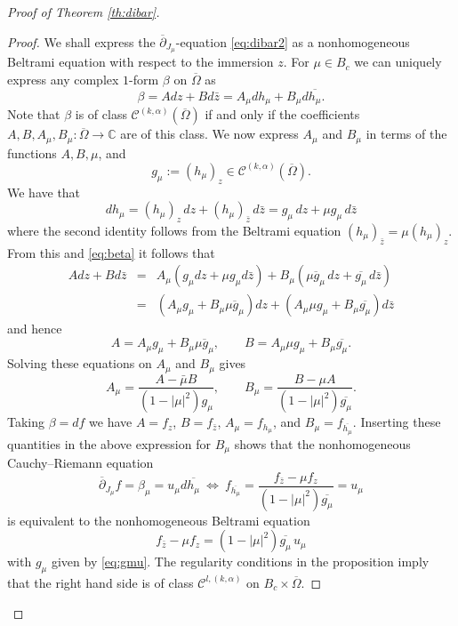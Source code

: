 \documentclass[10pt,a4paper]{amsart}
\newcommand\C{\mathbb{C}}
\newcommand\Cscr{\mathscr{C}}
\newcommand\dibar{\overline\partial}
\begin{document}
\begin{proof}[Proof of Theorem \ref{th:dibar}]
\begin{proof}
We shall express the $\dibar_{J_\mu}$-equation \eqref{eq:dibar2} as a 
nonhomogeneous Beltrami equation with respect to the immersion $z$.
For $\mu\in B_c$ we can uniquely express any complex $1$-form 
$\beta$ on $\overline\Omega$ as 
\begin{equation}\label{eq:beta}
	\beta=A dz+Bd\bar z = A_\mu dh_\mu + B_\mu d\overline{h_\mu}.
\end{equation}
Note that $\beta$ is of class $\Cscr^{(k,\alpha)}(\overline\Omega)$
if and only if the coefficients $A,B,A_\mu,B_\mu:\overline\Omega\to\C$
are of this class. We now express $A_\mu$ and $B_\mu$ in terms of 
the functions $A,B,\mu$, and 
\begin{equation}\label{eq:gmu}	
	g_\mu := (h_\mu)_z \in \Cscr^{(k,\alpha)}(\overline\Omega).
\end{equation}
We have that 
\[
	dh_\mu = (h_\mu)_z \, dz + (h_\mu)_{\bar z} \, d\bar z
	= g_\mu\, dz + \mu g_\mu \, d\bar z
\]
where the second identity follows from the Beltrami equation
$(h_\mu)_{\bar z}=\mu (h_\mu)_z$. From this and \eqref{eq:beta} it follows that
\begin{eqnarray*}
	A dz+Bd\bar z &=& A_\mu (g_\mu dz + \mu g_\mu d\bar z)
	+ B_\mu (\overline {\mu g_\mu}\, dz + \overline{g_\mu} \, d\bar z) \\
	&=& (A_\mu g_\mu + B_\mu \overline{\mu g_\mu}) dz
	+ (A_\mu \mu g_\mu + B_\mu \overline{g_\mu}) d\bar z
\end{eqnarray*}
and hence
\[
	A = A_\mu g_\mu + B_\mu \overline{\mu g_\mu},
	\qquad
	B = A_\mu \mu g_\mu + B_\mu \overline{g_\mu}.
\]
Solving these equations on $A_\mu$ and $B_\mu$ gives
\[
	A_\mu = \frac{A  - \bar \mu B}{(1-|\mu|^2)g_\mu}, %
	\qquad 
	B_\mu = \frac{B  - \mu A}{(1-|\mu|^2) \overline{g_\mu}}.
\]
Taking $\beta=df$ we have $A=f_z$, $B=f_{\bar z}$, $A_\mu = f_{h_\mu}$, 
and $B_\mu= f_{\overline{h_\mu}}$. Inserting these quantities in 
the above expression for $B_\mu$ shows that the 
nonhomogeneous Cauchy--Riemann equation 
\[
	\dibar_{J_\mu} f = \beta_\mu = u_\mu d\overline{h_\mu} 
	\ \Longleftrightarrow \ 
	f_{\overline{h_\mu}} = 
	\frac{f_{\bar z}-\mu f_z} {(1-|\mu|^2) \overline{g_\mu}} = u_\mu
\]
is equivalent to the nonhomogeneous Beltrami equation 
\begin{equation}\label{eq:dibarmu}
	f_{\bar z}-\mu f_z = (1-|\mu|^2) \overline{g_\mu} \, u_\mu
\end{equation}
with $g_\mu$ given by \eqref{eq:gmu}. 
The regularity conditions in the proposition imply that the right hand side is of class $\Cscr^{l,(k,\alpha)}$ on $B_c\times \overline\Omega$. 

\end{proof}
\end{proof}
\end{document}
